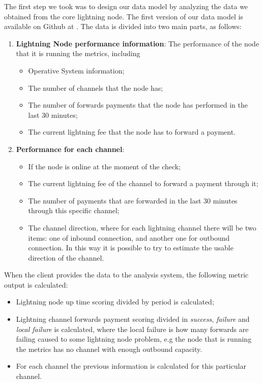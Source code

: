 The first step we took was to design our data model by analyzing the data we 
obtained from the core lightning node. The first version of our data model is 
available on Github at \cite{lnmetrics_localreputation}. The data is divided 
into two main parts, as follows:

\begin{enumerate}
    \item {\bf Lightning Node performance information}: The performance of the node that it is running
        the metrics, including
        \begin{itemize}
           \item Operative System information;
           \item The number of channels that the node has;
           \item The number of forwards payments that the node has performed in the 
               last 30 minutes;
           \item The current lightning fee that the node has to 
               forward a payment.
        \end{itemize}
    \item {\bf Performance for each channel}:
    \begin{itemize}
        \item If the node is online at the moment of the check;
        \item The current lightning fee of the channel to forward a payment through it;
        \item The number of payments that are forwarded in the last 30 minutes through this specific 
            channel;
        \item The channel direction, where for each lightning channel there will be two items: one of 
            inbound connection, and another one for outbound connection. In this way it is possible to 
            try to estimate the usable direction of the channel.
    \end{itemize}
\end{enumerate}

When the client provides the data to the analysis system, the following metric 
output is calculated:

\begin{itemize}
    \item Lightning node up time scoring divided by period is calculated;
    \item Lightning channel forwards payment scoring divided in \emph{success}, \emph{failure} and \emph{local failure}
        is calculated, where the local failure is how many forwards are failing caused to some lightning node problem,
        e.g the node that is running the metrics has no channel with enough outbound capacity. 
    \item For each channel the previous information is calculated for this particular channel.
\end{itemize}



